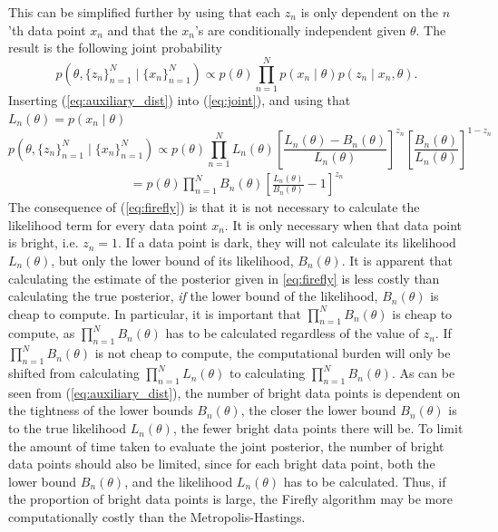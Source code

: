  This can be simplified further by using that each $z_n$ is only dependent on the $n$'th data point $x_n$ and that the $x_n$'s are conditionally independent given $\theta$. 
 The result is the following joint probability 
\begin{equation}\label{eq:joint}
           p(\theta, \{z_n\}_{n=1}^N \mid \{x_n\}_{n=1}^N) \propto p(\theta) \prod_{n=1}^N p(x_n\mid\theta)p(z_n\mid x_n, \theta).
\end{equation}
Inserting (\ref{eq:auxiliary_dist}) into (\ref{eq:joint}), and using that $L_n(\theta) = p(x_n\mid\theta)$
\begin{equation}
     p(\theta, \{z_n\}_{n=1}^N\mid\{x_n\}_{n=1}^N )\propto p(\theta) \prod_{n=1}^N L_n(\theta)\left[\frac{L_n(\theta) - B_n\left(\theta\right)}{L_n\left(\theta\right)}\right]^{z_n}\left[\frac{B_n\left(\theta\right)}{L_n\left(\theta\right)}\right]^{1-z_n} 
\end{equation}
\begin{equation}
\label{eq:firefly}
\begin{split}
     =p(\theta) \prod_{n = 1}^N
B_n\left(\theta\right) \left[\frac{L_n\left(\theta\right)}{B_n\left(\theta\right)} - 1\right]^{z_n} 
\end{split}
\end{equation}
The consequence of (\ref{eq:firefly}) is that it is not necessary to calculate the likelihood term for every data point $x_n$. 
It is only necessary when that data point is bright, i.e. $z_n = 1$. 
If a data point is dark, they will not calculate its likelihood $L_n(\theta)$, but only the lower bound of its likelihood, $B_n(\theta)$. It is apparent that calculating the estimate of the posterior given in \eqref{eq:firefly} is less costly than calculating the true posterior, \textit{if} the  lower bound of the likelihood, $B_n\left(\theta\right)$ is cheap to compute. In particular, it is important that $\prod_{n=1}^N B_n\left(\theta\right)$ is cheap to compute, as $\prod_{n=1}^N B_n\left(\theta\right)$ has to be calculated regardless of the value of $z_n$. If $\prod_{n=1}
^N B_n\left(\theta\right)$ is not cheap to compute, the computational burden will only be shifted from calculating $\prod_{n=1}^N L_n\left(\theta\right)$ to calculating $\prod_{n=1}^N B_n\left(\theta\right)$.  
As can be seen from (\ref{eq:auxiliary_dist}), the number of bright data points is dependent on the tightness of the lower bounds $B_n(\theta)$, the closer the lower bound $B_n\left(\theta\right)$ is to the true likelihood $L_n\left(\theta\right)$, the fewer bright data points there will be.  
To limit the amount of time taken to evaluate the joint posterior, the number of bright data points should also be limited, since for each bright data point, both the lower bound $B_n\left(\theta\right)$, and the likelihood $L_n\left(\theta\right)$ has to be calculated. Thus, if the proportion of bright data points is large, the Firefly algorithm may be more computationally costly than the Metropolis-Hastings. 

